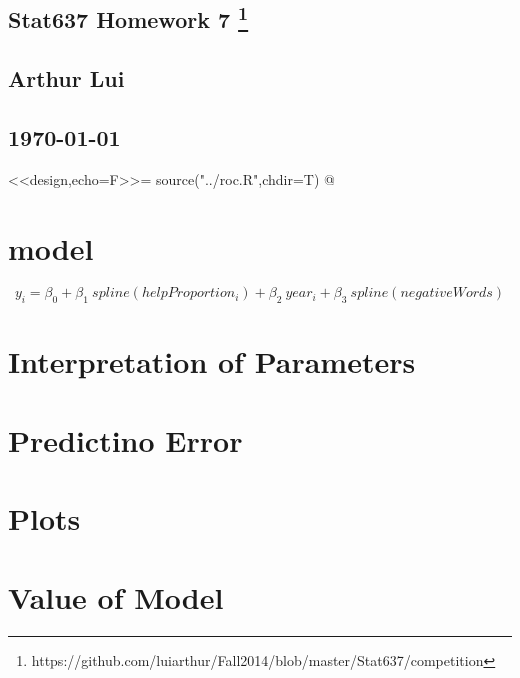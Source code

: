 \documentclass{article}
\begin{document}


\begin{center}
  \section*{\textbf{Stat637 Homework 7}
    \footnote{https://github.com/luiarthur/Fall2014/blob/master/Stat637/competition}
  }  
  \subsection*{\textbf{Arthur Lui}}
  \subsection*{\noindent\today}
\end{center}

<<design,echo=F>>=
  source("../roc.R",chdir=T)
@

\section{model}
\[
  y_i = \beta_0 + \beta_1~spline(helpProportion_i) + \beta_2~year_i + \beta_3~spline(negativeWords)
\]
\section{Interpretation of Parameters}
\section{Predictino Error}
\section{Plots}

\section{Value of Model}
\end{document}
